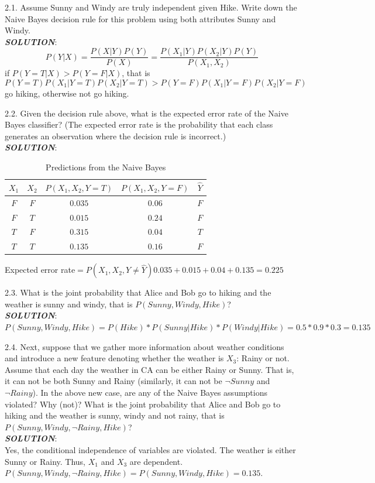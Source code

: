 \documentclass{article}
\theoremstyle{definition}
\theoremstyle{definition}
\theoremstyle{remark}
\begin{document}
2.1. Assume Sunny and Windy are truly independent given Hike. Write down the Naive Bayes
decision rule for this problem using both attributes Sunny and Windy.\\
\emph{\textbf{SOLUTION}}:\\
\[P(Y|X)=\frac{P(X|Y)P(Y)}{P(X)}=\frac{P(X_1|Y)P(X_2|Y)P(Y)}{P(X_1,X_2)}\]
if $P(Y=T|X)>P(Y=F|X)$, that is
\[P(Y=T)P(X_1|Y=T)P(X_2|Y=T)>P(Y=F)P(X_1|Y=F)P(X_2|Y=F)\]
go hiking, otherwise not go hiking.

2.2. Given the decision rule above, what is the expected error rate of the Naive Bayes classifier? (The
expected error rate is the probability that each class generates an observation where the decision
rule is incorrect.)\\
\emph{\textbf{SOLUTION}}:\\
\begin{table}[!htbp]
\centering
\begin{tabular}{|c|c|c|c|c|}
\hline
 $X_1$& $X_2$ & $P(X_1,X_2,Y=T)$ &$ P(X_1,X_2,Y=F)$ &$ \hat{Y}$ \\
\hline
$F$ & $F$ & $0.035$ & $0.06$& $F$\\
\hline
$F$ & $T$ & $0.015$ & $0.24$ & $F$ \\
\hline
$T$ & $F$ & $0.315$ & $0.04$& $T$\\
\hline
$T$ & $T$ & $0.135$ & $0.16$ & $F$ \\
\hline
\end{tabular}
\caption{Predictions from the Naive Bayes}
\end{table}
Expected error rate$ =P(X_1,X_2,Y\neq\hat{Y}) 0.035+0.015+0.04+0.135 = 0.225$

2.3. What is the joint probability that Alice and Bob go to hiking and the weather is sunny and
windy, that is $P(Sunny,Windy,Hike)$?\\
\emph{\textbf{SOLUTION}}:\\
$P(Sunny,Windy,Hike) = P(Hike)*P(Sunny|Hike)*P(Windy|Hike)=0.5*0.9*0.3=0.135$

2.4. Next, suppose that we gather more information about weather conditions and introduce a new feature
denoting whether the weather is $X_3$: Rainy or not. Assume that each day the weather in CA can
be either Rainy or Sunny. That is, it can not be both Sunny and Rainy (similarly, it can not be
$\neg Sunny$ and $\neg Rainy$). In the above new case, are any of the Naive Bayes assumptions violated? Why (not)? What is
the joint probability that Alice and Bob go to hiking and the weather is sunny, windy and not
rainy, that is $P(Sunny,Windy,\neg Rainy,Hike)$?\\
\emph{\textbf{SOLUTION}}:\\
Yes, the conditional independence of variables are violated. The weather is either Sunny or Rainy. Thus,
$X_1$ and $X_3$ are dependent. $P(Sunny,Windy,\neg Rainy,Hike)=P(Sunny,Windy,Hike)=0.135.$
\end{document}
